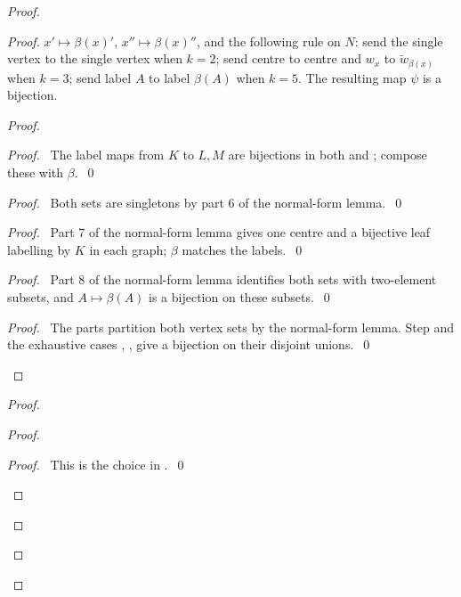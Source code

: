 \begin{proof}
\begin{proof}
{   $x'\mapsto\beta(x)'$, $x''\mapsto\beta(x)''$, and the following rule on $N$:
   send the single vertex to the single vertex when $k=2$; send centre to centre and
   $w_x$ to $\widetilde w_{\beta(x)}$ when $k=3$; send label $A$ to label $\beta(A)$
   when $k=5$. The resulting map $\psi$ is a bijection.}
  \begin{proof}
   \begin{proof}\pf\ The label maps from $K$ to $L,M$ are bijections in both
     and ; compose these with $\beta$.~\qed\end{proof}
   \begin{proof}\pf\ Both sets are singletons by part 6 of the normal-form lemma.~\qed\end{proof}
   \begin{proof}\pf\ Part 7 of the normal-form lemma gives one centre and a
    bijective leaf labelling by $K$ in each graph; $\beta$ matches the labels.~\qed\end{proof}
   \begin{proof}\pf\ Part 8 of the normal-form lemma identifies both sets with
    two-element subsets, and $A\mapsto\beta(A)$ is a bijection on these subsets.~\qed\end{proof}
   \qedstep
   \begin{proof}\pf\ The parts partition both vertex sets by the normal-form lemma.
    Step  and the exhaustive cases
    , , 
    give a bijection on their disjoint unions.~\qed\end{proof}
  \end{proof}
  \begin{proof}
   \begin{proof}
    \begin{proof}\pf\ This is the choice in .~\qed\end{proof}

\end{proof}
\end{proof}
\end{proof}
\end{proof}
